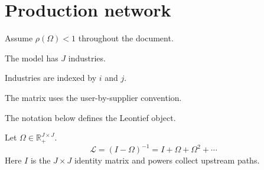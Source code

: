 \documentclass{article}
\begin{document}
\section{Production network}
Assume $\rho(\Omega)<1$ throughout the document.

The model has $J$ industries.

Industries are indexed by $i$ and $j$.

The matrix uses the user-by-supplier convention.

The notation below defines the Leontief object.

Let $\Omega\in\mathbb{R}^{J\times J}_{+}$.
\begin{equation}
  \mathcal L=(I-\Omega)^{-1}=I+\Omega+\Omega^2+\cdots
  \label{eq:leontief}
\end{equation}
Here $I$ is the $J\times J$ identity matrix and powers collect upstream paths.
\end{document}
